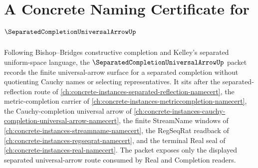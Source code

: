 \chapter{A Concrete Naming Certificate for $\SeparatedCompletionUniversalArrowUp$}
\label{ch:concrete-instances-separated-completion-universal-arrow-namecert}

Following Bishop--Bridges constructive completion and Kelley's separated uniform-space language, the $\SeparatedCompletionUniversalArrowUp$ packet records the finite universal-arrow surface for a separated completion without quotienting Cauchy names or selecting representatives. It sits after the separated-reflection route of \autoref{ch:concrete-instances-separated-reflection-namecert}, the metric-completion carrier of \autoref{ch:concrete-instances-metriccompletion-namecert}, the Cauchy-completion universal arrow of \autoref{ch:concrete-instances-cauchy-completion-universal-arrow-namecert}, the finite StreamName windows of \autoref{ch:concrete-instances-streamname-namecert}, the RegSeqRat readback of \autoref{ch:concrete-instances-regseqrat-namecert}, and the terminal Real seal of \autoref{ch:concrete-instances-real-namecert}. The packet exposes only the displayed separated universal-arrow route consumed by Real and Completion readers.

